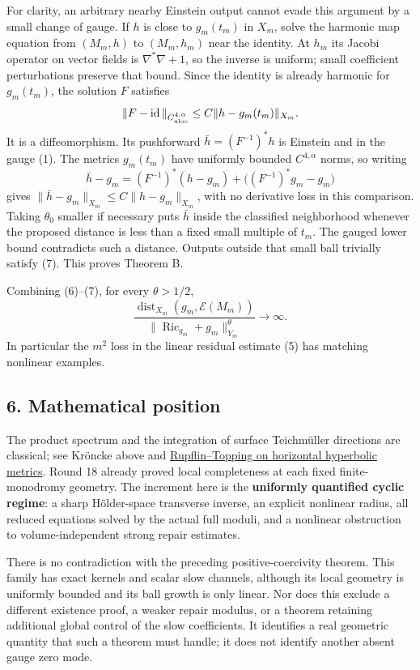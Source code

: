 \documentclass[
  11pt,
]{article}
\begin{document}
For clarity, an arbitrary nearby Einstein output cannot evade this
argument by a small change of gauge. If \(h\) is close to \(g_m(t_m)\)
in \(X_m\), solve the harmonic map equation from \((M_m,h)\) to
\((M_m,h_m)\) near the identity. At \(h_m\) its Jacobi operator on
vector fields is \(\nabla^*\nabla+1\), so the inverse is uniform; small
coefficient perturbations preserve that bound. Since the identity is
already harmonic for \(g_m(t_m)\), the solution \(F\) satisfies \[
 \|F-\operatorname{id}\|_{C^{4,\alpha}_{\rm uloc}}
                       \le C\|h-g_m(t_m)\|_{X_m}.
\] It is a diffeomorphism. Its pushforward \(\bar h=(F^{-1})^*h\) is
Einstein and in the gauge (1). The metrics \(g_m(t_m)\) have uniformly
bounded \(C^{4,\alpha}\) norms, so writing \[
 \bar h-g_m=(F^{-1})^*(h-g_m)
                       +\bigl((F^{-1})^*g_m-g_m\bigr)
\] gives \(\|\bar h-g_m\|_{X_m}\le C\|h-g_m\|_{X_m}\), with no
derivative loss in this comparison. Taking \(\theta_0\) smaller if
necessary puts \(\bar h\) inside the classified neighborhood whenever
the proposed distance is less than a fixed small multiple of \(t_m\).
The gauged lower bound contradicts such a distance. Outputs outside that
small ball trivially satisfy (7). This proves Theorem B.

Combining (6)--(7), for every \(\theta>1/2\), \[
 \frac{\operatorname{dist}_{X_m}(g_m,\mathscr E(M_m))}
      {\|\operatorname{Ric}_{g_m}+g_m\|_{Y_m}^{\theta}}
                       \longrightarrow\infty.
\] In particular the \(m^2\) loss in the linear residual estimate (5)
has matching nonlinear examples.

\hypertarget{mathematical-position}{%
\subsection{6. Mathematical position}\label{mathematical-position}}

The product spectrum and the integration of surface Teichmüller
directions are classical; see Kröncke above and
\href{https://link.springer.com/article/10.1007/s00526-018-1386-y}{Rupflin--Topping
on horizontal hyperbolic metrics}. Round 18 already proved local
completeness at each fixed finite-monodromy geometry. The increment here
is the \textbf{uniformly quantified cyclic regime}: a sharp Hölder-space
transverse inverse, an explicit nonlinear radius, all reduced equations
solved by the actual full moduli, and a nonlinear obstruction to
volume-independent strong repair estimates.

There is no contradiction with the preceding positive-coercivity
theorem. This family has exact kernels and scalar slow channels,
although its local geometry is uniformly bounded and its ball growth is
only linear. Nor does this exclude a different existence proof, a weaker
repair modulus, or a theorem retaining additional global control of the
slow coefficients. It identifies a real geometric quantity that such a
theorem must handle; it does not identify another absent gauge zero
mode.
\end{document}
